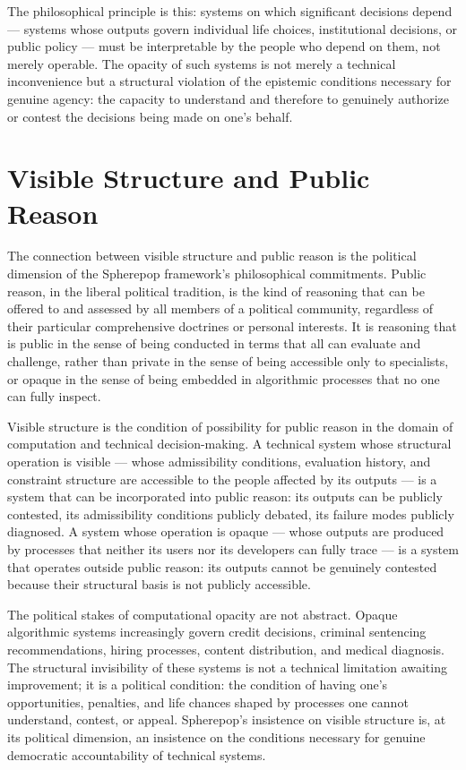 \documentclass[12pt,openany]{book}
\theoremstyle{plain}
\theoremstyle{definition}
\theoremstyle{remark}
\begin{document}
The philosophical principle is this: systems on which significant decisions depend — systems whose outputs govern individual life choices, institutional decisions, or public policy — must be interpretable by the people who depend on them, not merely operable. The opacity of such systems is not merely a technical inconvenience but a structural violation of the epistemic conditions necessary for genuine agency: the capacity to understand and therefore to genuinely authorize or contest the decisions being made on one's behalf.

\section{Visible Structure and Public Reason}

The connection between visible structure and public reason is the political dimension of the Spherepop framework's philosophical commitments. Public reason, in the liberal political tradition, is the kind of reasoning that can be offered to and assessed by all members of a political community, regardless of their particular comprehensive doctrines or personal interests. It is reasoning that is public in the sense of being conducted in terms that all can evaluate and challenge, rather than private in the sense of being accessible only to specialists, or opaque in the sense of being embedded in algorithmic processes that no one can fully inspect.

Visible structure is the condition of possibility for public reason in the domain of computation and technical decision-making. A technical system whose structural operation is visible — whose admissibility conditions, evaluation history, and constraint structure are accessible to the people affected by its outputs — is a system that can be incorporated into public reason: its outputs can be publicly contested, its admissibility conditions publicly debated, its failure modes publicly diagnosed. A system whose operation is opaque — whose outputs are produced by processes that neither its users nor its developers can fully trace — is a system that operates outside public reason: its outputs cannot be genuinely contested because their structural basis is not publicly accessible.

The political stakes of computational opacity are not abstract. Opaque algorithmic systems increasingly govern credit decisions, criminal sentencing recommendations, hiring processes, content distribution, and medical diagnosis. The structural invisibility of these systems is not a technical limitation awaiting improvement; it is a political condition: the condition of having one's opportunities, penalties, and life chances shaped by processes one cannot understand, contest, or appeal. Spherepop's insistence on visible structure is, at its political dimension, an insistence on the conditions necessary for genuine democratic accountability of technical systems.
\end{document}
